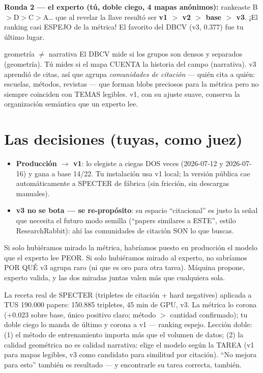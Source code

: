 \documentclass[11pt,a4paper]{article}
\begin{document}
\textbf{Ronda 2 --- el experto (tú, doble ciego, 4 mapas anónimos):} rankeaste
B$>$D$>$C$>$A\ldots{} que al revelar la llave resultó ser \textbf{v1 $>$ v2 $>$ base $>$
v3}. ¡El ranking casi ESPEJO de la métrica! El favorito del DBCV (v3, 0.377) fue tu
último lugar.

\begin{concepto}{geometría $\neq$ narrativa}
El DBCV mide si los grupos son densos y separados (geometría). Tú mides si el mapa
CUENTA la historia del campo (narrativa). v3 aprendió de citas, así que agrupa
\emph{comunidades de citación} --- quién cita a quién: escuelas, métodos, revistas ---
que forman blobs preciosos para la métrica pero no siempre coinciden con TEMAS legibles.
v1, con su ajuste suave, conserva la organización semántica que un experto lee.
\end{concepto}

\section{Las decisiones (tuyas, como juez)}

\begin{itemize}
  \item \textbf{Producción $\to$ v1}: lo elegiste a ciegas DOS veces (2026-07-12 y
        2026-07-16) y gana a base 14/22. Tu instalación usa v1 local; la versión pública
        cae automáticamente a SPECTER de fábrica (sin fricción, sin descargas manuales).
  \item \textbf{v3 no se bota --- se re-propósito}: su espacio ``citacional'' es justo la
        señal que necesita el futuro modo semilla (``papers similares a ESTE'', estilo
        ResearchRabbit): ahí las comunidades de citación SON lo que buscas.
\end{itemize}

\begin{ojo}
Si solo hubiéramos mirado la métrica, habríamos puesto en producción el modelo que el
experto lee PEOR. Si solo hubiéramos mirado al experto, no sabríamos POR QUÉ v3 agrupa
raro (ni que es oro para otra tarea). Máquina propone, experto valida, y las dos
miradas juntas valen más que cualquiera sola.
\end{ojo}

\begin{resumen}
La receta real de SPECTER (tripletes de citación + hard negatives) aplicada a TUS
190.000 papers: 150.885 tripletes, 45 min de GPU, v3. La métrica lo corona ($+0.023$
sobre base, único positivo claro; método $>$ cantidad confirmado); tu doble ciego lo
manda de último y corona a v1 --- ranking espejo. Lección doble: (1) el método de
entrenamiento importa más que el volumen de datos; (2) la calidad geométrica no es
calidad narrativa: elige el modelo según la TAREA (v1 para mapas legibles, v3 como
candidato para similitud por citación). ``No mejora para esto'' también es resultado
--- y encontrarle su tarea correcta, también.
\end{resumen}
\end{document}
